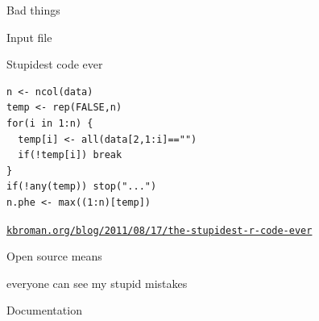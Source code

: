 \documentclass[12pt,t]{beamer}
\begin{document}
\begin{frame}{}

\vspace*{16.7mm}

\centerline{\Large Bad things}

\end{frame}


\begin{frame}[c]{Input file}


\end{frame}


\begin{frame}[c,fragile]{Stupidest code ever}

\begin{center}
\begin{minipage}[c]{9.3cm}
\begin{semiverbatim}
\lstset{basicstyle=\normalsize}
\begin{lstlisting}[linewidth=9.3cm]
n <- ncol(data)
temp <- rep(FALSE,n)
for(i in 1:n) {
  temp[i] <- all(data[2,1:i]=="")
  if(!temp[i]) break
}
if(!any(temp)) stop("...")
n.phe <- max((1:n)[temp])
\end{lstlisting}
\end{semiverbatim}
\end{minipage}
\end{center}

\vspace{3mm}

\hfill \href{http://kbroman.org/blog/2011/08/17/the-stupidest-r-code-ever}{\scriptsize \lolit \tt kbroman.org/blog/2011/08/17/the-stupidest-r-code-ever}

\end{frame}


\begin{frame}[c]{}

  \large

  {\hilit Open source} {\lolit means}

  everyone can see my stupid mistakes

  \bigskip \bigskip \bigskip


\end{frame}


\begin{frame}{}

\vspace*{16.7mm}

\centerline{\Large Documentation}

\end{frame}
\end{document}
